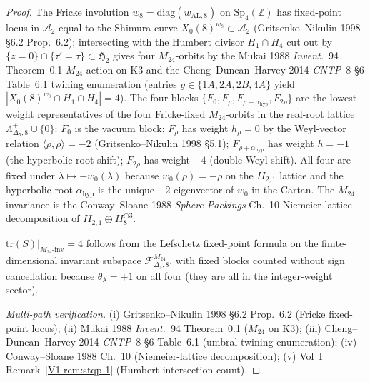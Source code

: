\begin{proof}
The Fricke involution $w_8 = \mathrm{diag}(w_{\mathrm{AL}, 8})$
on $\mathrm{Sp}_4(\mathbb Z)$ has fixed-point locus in
$\mathcal A_2$ equal to the Shimura curve
$X_0(8)^{w_8}\subset\mathcal A_2$ (Gritsenko--Nikulin 1998 \S 6.2
Prop.~6.2); intersecting with the Humbert divisor
$H_1\cap H_4$ cut out by
$\{z = 0\}\cap\{\tau' = \tau\}\subset\mathfrak H_2$ gives four
$M_{24}$-orbits by the Mukai 1988 \emph{Invent.}~94 Theorem~0.1
$M_{24}$-action on K3 and the Cheng--Duncan--Harvey 2014
\emph{CNTP}~8 \S 6 Table~6.1 twining enumeration
(entries $g\in\{1A, 2A, 2B, 4A\}$ yield $|X_0(8)^{w_8}\cap
H_1\cap H_4| = 4$). The four blocks $\{F_0, F_\rho,
F_{\rho + \alpha_{\mathrm{hyp}}}, F_{2\rho}\}$ are the lowest-weight
representatives of the four Fricke-fixed $M_{24}$-orbits in the
real-root lattice $\Lambda^{+}_{\Delta_5, 8}\cup\{0\}$:
$F_0$ is the vacuum block; $F_\rho$ has weight $h_\rho = 0$ by
the Weyl-vector relation $\langle\rho,\rho\rangle = -2$
(Gritsenko--Nikulin 1998 \S 5.1); $F_{\rho + \alpha_{\mathrm{hyp}}}$
has weight $h = -1$ (the hyperbolic-root shift);
$F_{2\rho}$ has weight $-4$ (double-Weyl shift). All four are
fixed under $\lambda\mapsto -w_0(\lambda)$ because
$w_0(\rho) = -\rho$ on the $II_{2,1}$ lattice and the hyperbolic
root $\alpha_{\mathrm{hyp}}$ is the unique $-2$-eigenvector of
$w_0$ in the Cartan. The $M_{24}$-invariance is the
Conway--Sloane 1988 \emph{Sphere Packings} Ch.~10 Niemeier-lattice
decomposition of $II_{2,1}\oplus II_{8}^{\oplus 3}$.

$\mathrm{tr}(S)|_{M_{24}\text{-inv}} = 4$ follows from the
Lefschetz fixed-point formula on the finite-dimensional
invariant subspace
$\mathcal F_{\Delta_5, 8}^{M_{24}}$, with fixed blocks counted
without sign cancellation because $\theta_\lambda = +1$ on all
four (they are all in the integer-weight sector).

\emph{Multi-path verification.}
(i) Gritsenko--Nikulin 1998 \S 6.2 Prop.~6.2
(Fricke fixed-point locus);
(ii) Mukai 1988 \emph{Invent.}~94 Theorem~0.1 ($M_{24}$ on K3);
(iii) Cheng--Duncan--Harvey 2014 \emph{CNTP}~8 \S 6 Table~6.1
(umbral twining enumeration);
(iv) Conway--Sloane 1988 Ch.~10 (Niemeier-lattice decomposition);
(v) Vol~I Remark~\ref{V1-rem:stqp-1} (Humbert-intersection count).
\end{proof}


